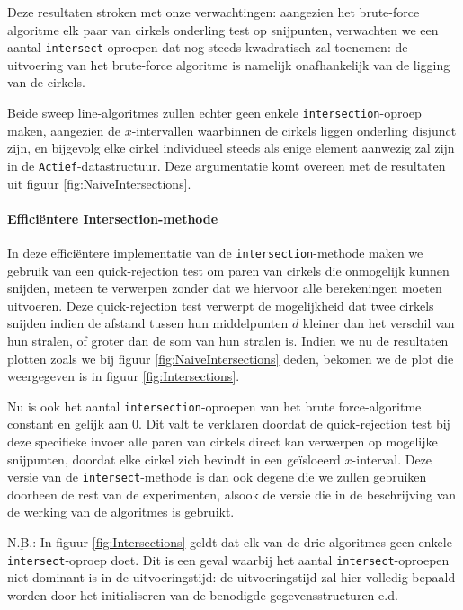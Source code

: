 \documentclass[12pt]{article}
\begin{document}
Deze resultaten stroken met onze verwachtingen: aangezien het brute-force algoritme elk paar van cirkels onderling test op snijpunten, verwachten we een aantal \texttt{intersect}-oproepen dat nog steeds kwadratisch zal toenemen: de uitvoering van het brute-force algoritme is namelijk onafhankelijk van de ligging van de cirkels. 

Beide sweep line-algoritmes zullen echter geen enkele \texttt{intersection}-oproep maken, aangezien de $x$-intervallen waarbinnen de cirkels liggen onderling disjunct zijn, en bijgevolg elke cirkel individueel steeds als enige element aanwezig zal zijn in de  \texttt{Actief}-datastructuur. Deze argumentatie komt overeen met de resultaten uit figuur \ref{fig:NaiveIntersections}.

\paragraph{Efficiëntere Intersection-methode}
In deze efficiëntere implementatie van de \texttt{intersection}-methode maken we gebruik van een quick-rejection test om paren van cirkels die onmogelijk kunnen snijden, meteen te verwerpen zonder dat we hiervoor alle berekeningen moeten uitvoeren. Deze quick-rejection test verwerpt de mogelijkheid dat twee cirkels snijden indien de afstand tussen hun middelpunten $d$ kleiner dan het verschil van hun stralen, of groter dan de som van hun stralen is. Indien we nu de resultaten plotten zoals we bij figuur \ref{fig:NaiveIntersections} deden, bekomen we de plot die weergegeven is in figuur \ref{fig:Intersections}.

Nu is ook het aantal \texttt{intersection}-oproepen van het brute force-algoritme constant en gelijk aan $0$. Dit valt te verklaren doordat de quick-rejection test bij deze specifieke invoer alle paren van cirkels direct kan verwerpen op mogelijke snijpunten, doordat elke cirkel zich bevindt in een geïsloeerd $x$-interval. Deze versie van de \texttt{intersect}-methode is dan ook degene die we zullen gebruiken doorheen de rest van de experimenten, alsook de versie die in de beschrijving van de werking van de algoritmes is gebruikt. 

$\underline{\text{N.B.:}}$ In figuur \ref{fig:Intersections} geldt dat elk van de drie algoritmes geen enkele \texttt{intersect}-oproep doet. Dit is een geval waarbij het aantal \texttt{intersect}-oproepen niet dominant is in de uitvoeringstijd: de uitvoeringstijd zal hier volledig bepaald worden door het initialiseren van de benodigde gegevensstructuren e.d.
\end{document}

